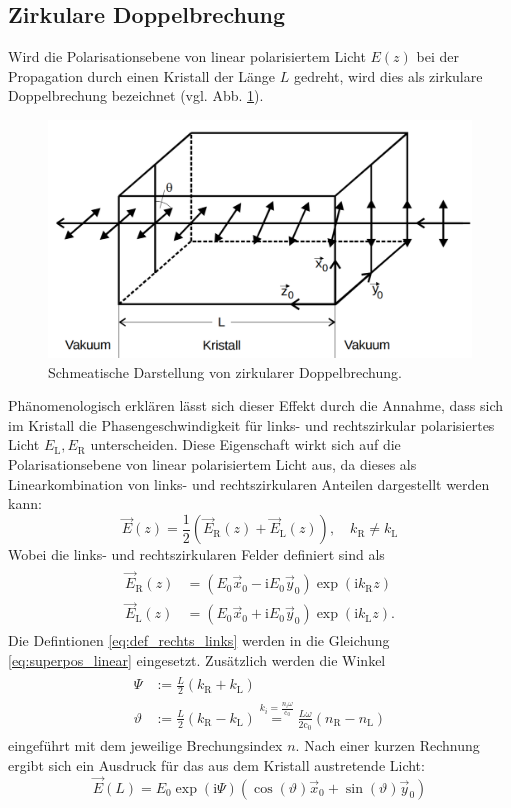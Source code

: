 \subsection{Zirkulare Doppelbrechung}
Wird die Polarisationsebene von linear polarisiertem Licht $E(z)$ bei der Propagation
durch einen Kristall der Länge $L$ gedreht, wird dies als zirkulare Doppelbrechung bezeichnet (vgl. Abb. \ref{fig:zirkulare_doppelbrechung}).
\begin{figure}
\centering
\includegraphics[width=0.5\linewidth]{./content/images/drehung_polarisationsebene.pdf}
\caption{Schmeatische Darstellung von zirkularer Doppelbrechung.}
\label{fig:zirkulare_doppelbrechung}
\end{figure}
Phänomenologisch erklären lässt sich dieser Effekt durch die Annahme, dass sich im
Kristall die Phasengeschwindigkeit für links- und rechtszirkular polarisiertes
Licht $E_\text{L}, E_\text{R}$ unterscheiden.
Diese Eigenschaft wirkt sich auf die Polarisationsebene
von linear polarisiertem Licht aus, da dieses als Linearkombination
von links- und rechtszirkularen Anteilen dargestellt werden kann:
\begin{equation}
  \label{eq:superpos_linear}
\vec{E}(z) = \frac{1}{2}( \vec{E}_\text{R}(z) + \vec{E}_\text{L}(z)), \quad k_\text{R}\neq k_\text{L}
\end{equation}
Wobei die links- und rechtszirkularen Felder definiert sind als
\begin{align}
  \label{eq:def_rechts_links}
  \begin{aligned}
  \vec{E}_\text{R}(z) &= \left(E_0 \vec{x}_0 - \text{i}E_0\vec{y}_0\right)\exp\left(\text{i}{k}_\text{R}z\right)\\
  \vec{E}_\text{L}(z) &= \left(E_0 \vec{x}_0 + \text{i}E_0\vec{y}_0\right)\exp\left(\text{i}{k}_\text{L}z\right).
\end{aligned}
\end{align}
Die Defintionen \eqref{eq:def_rechts_links} werden in die Gleichung \eqref{eq:superpos_linear}
eingesetzt.
Zusätzlich werden die Winkel
\begin{align}
  \label{eq:winkel}
  \begin{aligned}
    \Psi&:=\frac{L}{2}(k_\text{R}+k_\text{L}) \\
    \vartheta &:= \frac{L}{2}(k_\text{R}-k_\text{L}) \overset{k_i=\frac{n_i\omega}{\text{c}_0}}{=} \frac{L\omega}{2\text{c}_0}\left(n_\text{R}-n_\text{L}\right)
\end{aligned}
\end{align}
eingeführt mit dem jeweilige Brechungsindex $n$.
Nach einer kurzen Rechnung ergibt sich ein
Ausdruck für das aus dem Kristall austretende Licht:
\begin{equation*}
  \vec{E}(L)=E_0 \exp(\text{i}\Psi)\left(\cos(\vartheta) \vec{x}_0 + \sin(\vartheta)\vec{y}_0\right)
\end{equation*}

